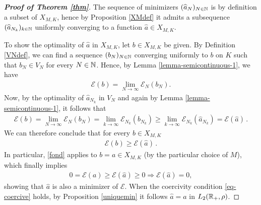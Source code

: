 \begin{proof}[\normalfont\bf Proof of Theorem \ref{thm}]
	The sequence of minimizers $(\widehat a_N)_{N \in \mathbb{N}}$ is by definition a subset of $X_{M,K}$, hence by Proposition \ref{XMdef} it admits a subsequence $(\widehat a_{N_k})_{k \in \mathbb{N}}$ uniformly converging to a function $\widehat a \in X_{M,K}$.
	
	To show the optimality of $\widehat a$ in $X_{M,K}$, let $b\in X_{M,K}$ be given. By Definition \ref{VNdef}, we can find a sequence $(b_N)_{N \in \mathbb{N}}$ converging uniformly to $b$ on $K$ such that $b_N\in V_N$ for every $N\in \mathbb{N}$. Hence, by Lemma \ref{lemma-semicontinuous-1}, we have
	\begin{align*}
		\mathcal E(b)=\lim_{N\rightarrow\infty} \mathcal E_{N}(b_{N}).
	\end{align*}
	Now, by the optimality of $\widehat a_{N_k}$ in $V_N$ and again by Lemma \ref{lemma-semicontinuous-1}, it follows that
	\begin{align*}
		\mathcal E(b)=\lim_{N\rightarrow\infty}\mathcal E_N(b_N)
			= \lim_{k \rightarrow\infty}\mathcal E_{N_k}(b_{N_k})
			\geq\lim_{k \rightarrow\infty}\mathcal E_{N_k}(\widehat a_{N_k})
			= \mathcal E(\widehat a)\,.
	\end{align*}
	We can therefore conclude that for every $b \in X_{M,K}$
	\begin{align}\label{fond}
		\mathcal E(b)\geq \mathcal E(\widehat a)\,.
	\end{align}
 In particular, \eqref{fond} applies to $b=a\in X_{M,K}$ (by the particular choice of $M$), which finally implies
	\begin{align*}
		0=\mathcal E(a)\geq \mathcal E(\widehat a)\geq 0\Longrightarrow \mathcal  E(\widehat a)=0,
	\end{align*}
	showing that $\widehat a$ is also a minimizer of $\mathcal E$. When the coercivity condition \eqref{eq-coercive} holds, by Proposition \ref{uniquemin} it follows $\widehat a=a$ in  $L_2(\mathbb{R}_+,\rho)$.
\end{proof}